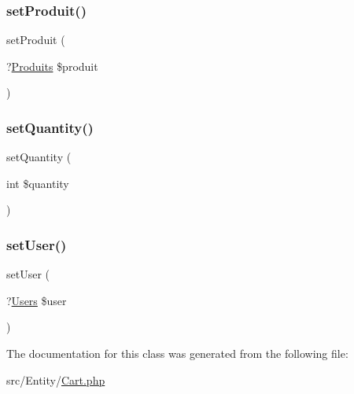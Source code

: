 \mbox{\label{class_app_1_1_entity_1_1_cart_aee1aa682ba8a05574c94b12e4a4bbc73}} 
\subsubsection{\texorpdfstring{set\+Produit()}{setProduit()}}
{\footnotesize\ttfamily set\+Produit (\begin{DoxyParamCaption}\item[{?\mbox{\hyperlink{class_app_1_1_entity_1_1_produits}{Produits}}}]{\$produit }\end{DoxyParamCaption})}

\mbox{\label{class_app_1_1_entity_1_1_cart_a6aaf2dab8685fde29dbdf49b782017df}} 
\subsubsection{\texorpdfstring{set\+Quantity()}{setQuantity()}}
{\footnotesize\ttfamily set\+Quantity (\begin{DoxyParamCaption}\item[{int}]{\$quantity }\end{DoxyParamCaption})}

\mbox{\label{class_app_1_1_entity_1_1_cart_a31170564fe4585dda0eb916f17323681}} 
\subsubsection{\texorpdfstring{set\+User()}{setUser()}}
{\footnotesize\ttfamily set\+User (\begin{DoxyParamCaption}\item[{?\mbox{\hyperlink{class_app_1_1_entity_1_1_users}{Users}}}]{\$user }\end{DoxyParamCaption})}



The documentation for this class was generated from the following file\+:\begin{DoxyCompactItemize}
\item 
src/\+Entity/\mbox{\hyperlink{_cart_8php}{Cart.\+php}}\end{DoxyCompactItemize}

